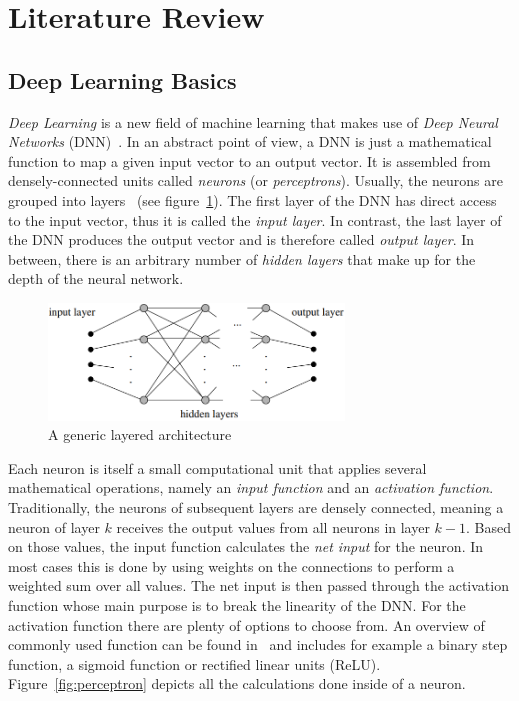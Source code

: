 \section{Literature Review}

\subsection{Deep Learning Basics}
\emph{Deep Learning} is a new field of machine learning that makes use of \emph{Deep Neural Networks} (DNN)~\cite[pp.~125f]{nn_intro96}. In an abstract point of view, a DNN is just a mathematical function to map a given input vector to an output vector. It is assembled from densely-connected units called \emph{neurons} (or \emph{perceptrons}). Usually, the neurons are grouped into layers~\cite[p.~125]{nn_intro96} (see figure~\ref{fig:layered_architecture}). The first layer of the DNN has direct access to the input vector, thus it is called the \emph{input layer}. In contrast, the last layer of the DNN produces the output vector and is therefore called \emph{output layer}. In between, there is an arbitrary number of \emph{hidden layers} that make up for the depth of the neural network.

\begin{figure}[h]
    \centering
    \includegraphics[width=0.7\textwidth]{images/generic_layered_architecture}
    \caption{A generic layered architecture~\cite[p.~126]{nn_intro96}}
    \label{fig:layered_architecture}
\end{figure}

Each neuron is itself a small computational unit that applies several mathematical operations, namely an \emph{input function} and an \emph{activation function}. Traditionally, the neurons of subsequent layers are densely connected, meaning a neuron of layer $k$ receives the output values from all neurons in layer $k-1$. Based on those values, the input function calculates the \emph{net input} for the neuron. In most cases this is done by using weights on the connections to perform a weighted sum over all values. The net input is then passed through the activation function whose main purpose is to break the linearity of the DNN. For the activation function there are plenty of options to choose from. An overview of commonly used function can be found in~\cite{act_funcs18} and includes for example a binary step function, a sigmoid function or rectified linear units (ReLU). Figure~\ref{fig:perceptron} depicts all the calculations done inside of a neuron.

